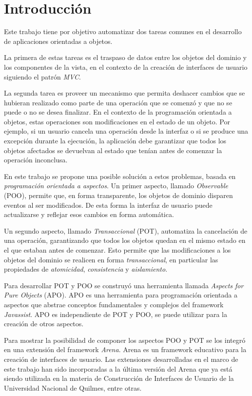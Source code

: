 \section{Introducción}

Este trabajo tiene por objetivo automatizar dos tareas comunes en el
desarrollo de aplicaciones orientadas a objetos.

La primera de estas tareas es el traspaso de datos entre los objetos del dominio
y los componentes de la vista, en el contexto de la creación de interfaces de
usuario siguiendo el patrón \emph{MVC}.
 
La segunda tarea es proveer un mecanismo que permita deshacer cambios que se
hubieran realizado como parte de una operación que se comenzó y que no se puede
o no se desea finalizar.
En el contexto de la programación orientada a objetos, estas operaciones son
modificaciones en el estado de un objeto.
Por ejemplo, si un usuario cancela una operación desde
la interfaz o si se produce una excepción durante la ejecución, la aplicación
debe garantizar que todos los objetos afectados se devuelvan al estado que
tenían antes de comenzar la operación inconclusa.

\medskip 

En este trabajo se propone una posible solución a estos problemas, basada en
\emph{programación orientada a aspectos}.
Un primer aspecto, llamado \emph{Observable} (POO), permite que, en forma
transparente, los objetos de dominio disparen eventos al ser modificados.
De esta forma la interfaz de usuario puede actualizarse y reflejar esos
cambios en forma automática.

Un segundo aspecto, llamado \emph{Transaccional} (POT), automatiza la
cancelación de una operación, garantizando que todos los objetos quedan en el
mismo estado en el que estaban antes de comenzar. 
Esto permite que las modificaciones a los objetos del dominio se realicen
en forma \emph{transaccional}, en particular las propiedades de
\emph{atomicidad}, \emph{consistencia} y \emph{aislamiento}.

Para desarrollar POT y POO se construyó una herramienta llamada
\emph{Aspects for Pure Objects} (APO).
APO es una herramienta para programación orientada a aspectos que abstrae
conceptos fundamentales y complejos del framework \emph{Javassist}. 
APO es independiente de POT y POO, se puede utilizar
para la creación de otros aspectos.

Para mostrar la posibilidad de componer los aspectos POO y POT se los integró en
una extensión del framework \emph{Arena}.
Arena es un framework educativo para la creación de interfaces de usuario.
Las extensiones desarrolladas en el marco de este trabajo han sido incorporadas
a la última versión del Arena que ya está siendo utilizada en la materia de
Construcción de Interfaces de Usuario de la Universidad Nacional de Quilmes,
entre otras.

